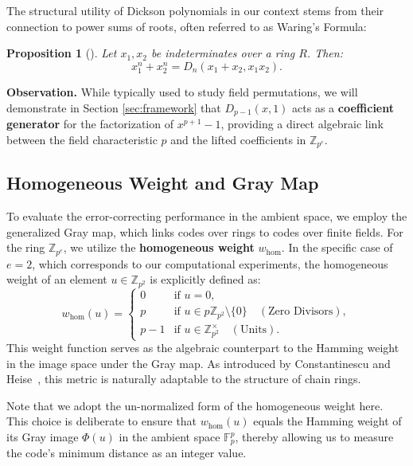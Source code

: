 \documentclass[12pt]{article}
\theoremstyle{plain}
\newtheorem{prop}{Proposition}
\numberwithin{equation}{section}
\begin{document}
The structural utility of Dickson polynomials in our context stems from their connection to power sums of roots, often referred to as Waring's Formula:

\begin{prop}[\cite{Lidl1997}]\label{prop:dickson_waring}
Let $x_1, x_2$ be indeterminates over a ring $R$. Then:
$$x_1^n + x_2^n = D_n(x_1 + x_2, x_1 x_2).$$
\end{prop}

\noindent \textbf{Observation.} While typically used to study field permutations, we will demonstrate in Section \ref{sec:framework} that $D_{p-1}(x, 1)$ acts as a \textbf{coefficient generator} for the factorization of $x^{p+1}-1$, providing a direct algebraic link between the field characteristic $p$ and the lifted coefficients in $\mathbb{Z}_{p^e}$.

\subsection{Homogeneous Weight and Gray Map}
\label{sec:gray_map}

To evaluate the error-correcting performance in the ambient space, we employ the generalized Gray map, which links codes over rings to codes over finite fields. 
For the ring $\mathbb{Z}_{p^e}$, we utilize the \textbf{homogeneous weight} $w_{\text{hom}}$. 
In the specific case of $e=2$, which corresponds to our computational experiments, the homogeneous weight of an element $u \in \mathbb{Z}_{p^2}$ is explicitly defined as:
\begin{equation}
    w_{\text{hom}}(u) = 
    \begin{cases} 
    0 & \text{if } u = 0, \\
    p & \text{if } u \in p\mathbb{Z}_{p^2} \setminus \{0\} \quad (\text{Zero Divisors}), \\
    p-1 & \text{if } u \in \mathbb{Z}_{p^2}^\times \quad (\text{Units}).
    \end{cases}
\end{equation}
This weight function serves as the algebraic counterpart to the Hamming weight in the image space under the Gray map. 
As introduced by Constantinescu and Heise~\cite{constantinescu1997metric}, this metric is naturally adaptable to the structure of chain rings.

Note that we adopt the un-normalized form of the homogeneous weight here. This choice is deliberate to ensure that $w_{\text{hom}}(u)$ equals the Hamming weight of its Gray image $\Phi(u)$ in the ambient space $\mathbb{F}_p^p$, thereby allowing us to measure the code's minimum distance as an integer value.
\end{document}
